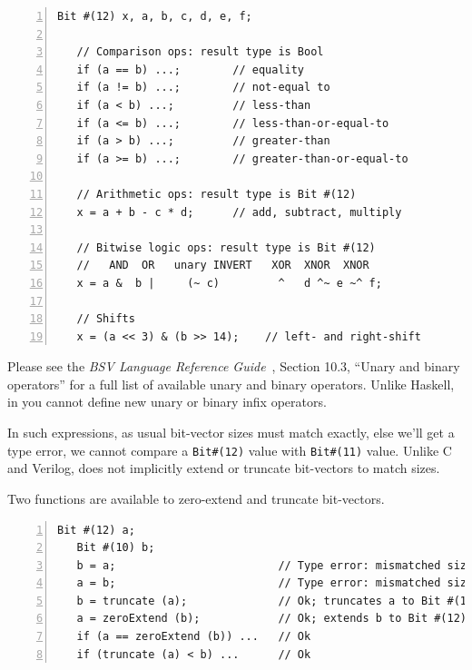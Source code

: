 
{\footnotesize
\begin{Verbatim}[frame=single, numbers=left]
   Bit #(12) x, a, b, c, d, e, f;

   // Comparison ops: result type is Bool
   if (a == b) ...;        // equality
   if (a != b) ...;        // not-equal to
   if (a < b) ...;         // less-than
   if (a <= b) ...;        // less-than-or-equal-to
   if (a > b) ...;         // greater-than
   if (a >= b) ...;        // greater-than-or-equal-to

   // Arithmetic ops: result type is Bit #(12)
   x = a + b - c * d;      // add, subtract, multiply

   // Bitwise logic ops: result type is Bit #(12)
   //   AND  OR   unary INVERT   XOR  XNOR  XNOR
   x = a &  b |     (~ c)         ^   d ^~ e ~^ f;

   // Shifts
   x = (a << 3) & (b >> 14);    // left- and right-shift
\end{Verbatim}
}

Please see the \emph{BSV Language Reference Guide}~\cite{BLang2000},
Section 10.3, ``Unary and binary operators'' for a full list of
available unary and binary operators.  Unlike Haskell, in {\BSV} you
cannot define new unary or binary infix operators.

In such expressions, as usual bit-vector sizes must match exactly,
else we'll get a type error, {\eg} we cannot compare a
\verb|Bit#(12)| value with \verb|Bit#(11)| value.  Unlike C and
Verilog, {\BSV} does not implicitly extend or truncate bit-vectors to
match sizes.


Two functions are available to zero-extend and truncate bit-vectors.

{\footnotesize
\begin{Verbatim}[frame=single, numbers=left]
   Bit #(12) a;
   Bit #(10) b;
   b = a;                         // Type error: mismatched sizes
   a = b;                         // Type error: mismatched sizes
   b = truncate (a);              // Ok; truncates a to Bit #(10), then assigns
   a = zeroExtend (b);            // Ok; extends b to Bit #(12), then assigns
   if (a == zeroExtend (b)) ...   // Ok
   if (truncate (a) < b) ...      // Ok
\end{Verbatim}
}

